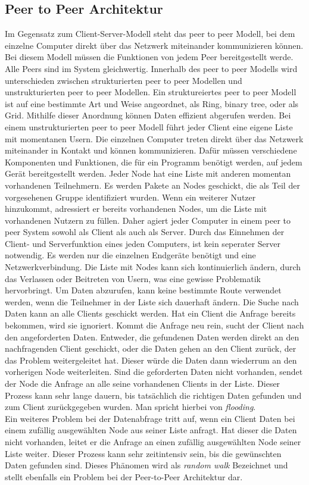 \subsection{Peer to Peer Architektur}
Im Gegensatz zum Client-Server-Modell steht das peer to peer Modell, bei dem einzelne Computer direkt über das Netzwerk miteinander kommunizieren können.
Bei diesem Modell müssen die Funktionen von jedem Peer bereitgestellt werde. Alle Peers sind im System gleichwertig.
Innerhalb des peer to peer Modells wird unterschieden zwischen strukturierten peer to peer Modellen und unstrukturierten peer to peer Modellen.
Ein struktureiertes peer to peer Modell ist auf eine bestimmte Art und Weise angeordnet, als Ring, binary tree, oder als Grid. Mithilfe dieser Anordnung können Daten effizient abgerufen werden.
Bei einem unstrukturierten peer to peer Modell führt jeder Client eine eigene Liste mit momentanen Usern\cite[S. 92]{steen23}.
Die einzelnen Computer treten direkt über das Netzwerk miteinander in Kontakt und können kommunizieren.
Dafür müssen verschiedene Komponenten und Funktionen, die für ein Programm benötigt werden, auf jedem Gerät bereitgestellt werden.
Jeder Node hat eine Liste mit anderen momentan vorhandenen Teilnehmern.
Es werden Pakete an Nodes geschickt, die als Teil der vorgesehenen Gruppe identifiziert wurden. 
Wenn ein weiterer Nutzer hinzukommt, adressiert er bereits vorhandenen Nodes, um die Liste mit vorhandenen Nutzern zu füllen.
Daher agiert jeder Computer in einem peer to peer System sowohl als Client als auch als Server.
Durch das Einnehmen der Client- und Serverfunktion eines jeden Computers, ist kein seperater Server notwendig.
Es werden nur die einzelnen Endgeräte benötigt und eine Netzwerkverbindung\cite[S. 748f]{tan10}.
Die Liste mit Nodes kann sich kontinuierlich ändern, durch das Verlassen oder Beitreten von Usern, was eine gewisse Problematik hervorbringt.
Um Daten abzurufen, kann keine bestimmte Route verwendet werden, wenn die Teilnehmer in der Liste sich dauerhaft ändern.
Die Suche nach Daten kann an alle Clients geschickt werden. Hat ein Client die Anfrage bereits bekommen, wird sie ignoriert.
Kommt die Anfrage neu rein, sucht der Client nach den angeforderten Daten. Entweder, die gefundenen Daten werden direkt an den nachfragenden Client geschickt, oder die Daten gehen an den Client zurück, der das Problem weitergeleitet hat.
Dieser würde die Daten dann wiederrum an den vorherigen Node weiterleiten. 
Sind die geforderten Daten nicht vorhanden, sendet der Node die Anfrage an alle seine vorhandenen Clients in der Liste.
Dieser Prozess kann sehr lange dauern, bis tatsächlich die richtigen Daten gefunden und zum Client zurückgegeben wurden.
Man spricht hierbei von \emph{flooding}\cite[S. 93]{steen23}.
\\
Ein weiteres Problem bei der Datenabfrage tritt auf, wenn ein Client Daten bei einem zufällig ausgewählten Node aus seiner Liste anfragt.
Hat dieser die Daten nicht vorhanden, leitet er die Anfrage an einen zufällig ausgewählten Node seiner Liste weiter. Dieser Prozess kann sehr zeitintensiv sein, bis die gewünschten Daten gefunden sind.
Dieses Phänomen wird als \emph{random walk} Bezeichnet und stellt ebenfalls ein Problem bei der Peer-to-Peer Architektur dar\cite[S. 93]{steen23}.

